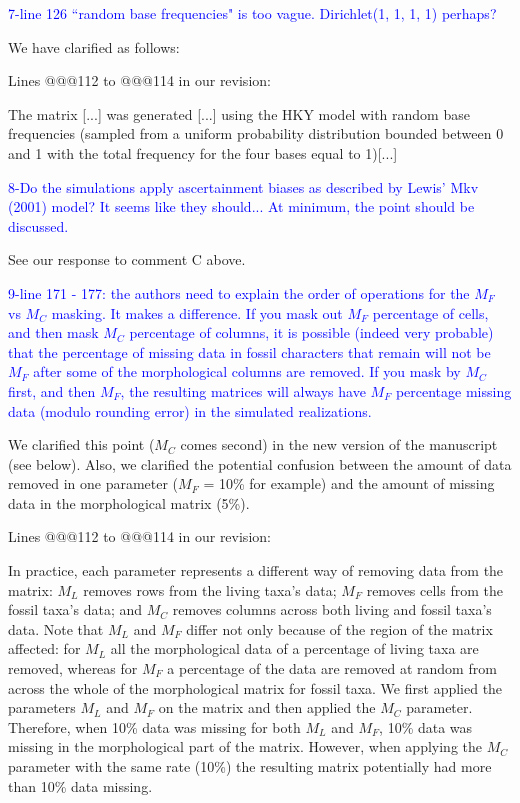\documentclass[11pt]{letter}
\begin{document}
\begin{letter}{}

\textcolor{blue}{7-line 126 ``random base frequencies" is too vague. Dirichlet(1, 1, 1, 1) perhaps?}

We have clarified as follows:

Lines @@@112 to @@@114 in our revision:

\hfill\begin{minipage}{\dimexpr\textwidth-1cm}
The matrix [...] was generated [...] using the HKY model with random base frequencies (sampled from a uniform probability distribution bounded between 0 and 1 with the total frequency for the four bases equal to 1)[...]
\end{minipage}


\textcolor{blue}{8-Do the simulations apply ascertainment biases as described by Lewis' Mkv (2001) model? It seems like they should... At minimum, the point should be discussed.}

See our response to comment C above.


\textcolor{blue}{9-line 171 - 177: the authors need to explain the order of operations for the $M_F$ vs $M_C$ masking. It makes a difference. If you mask out $M_F$ percentage of cells, and then mask $M_C$ percentage of columns, it is possible (indeed very probable) that the percentage of missing data in fossil characters that remain will not be $M_F$ after some of the morphological columns are removed. If you mask by $M_C$ first, and then $M_F$, the resulting matrices will always have $M_F$ percentage missing data (modulo rounding error) in the simulated realizations.}

We clarified this point ($M_C$ comes second) in the new version of the manuscript (see below). Also, we clarified the potential confusion between the amount of data removed in one parameter ($M_F$ = 10\% for example) and the amount of missing data in the morphological matrix (5\%).

Lines @@@112 to @@@114 in our revision: 

\hfill\begin{minipage}{\dimexpr\textwidth-1cm}
In practice, each parameter represents a different way of removing data from the matrix: $M_L$ removes rows from the living taxa's data; $M_F$ removes cells from the fossil taxa's data; and $M_C$ removes columns across both living and fossil taxa's data. Note that $M_L$ and $M_F$ differ not only because of the region of the matrix affected: for $M_L$ all the morphological data of a percentage of living taxa are removed, whereas for $M_F$ a percentage of the data are removed at random from across the whole of the morphological matrix for fossil taxa. We first applied the parameters $M_L$ and $M_F$ on the matrix and then applied the $M_C$ parameter. Therefore, when 10\% data was missing for both $M_L$ and $M_F$, 10\% data was missing in the morphological part of the matrix. However, when applying the $M_C$ parameter with the same rate (10\%) the resulting matrix potentially had more than 10\% data missing.
\end{minipage}


\end{letter}
\end{document}

